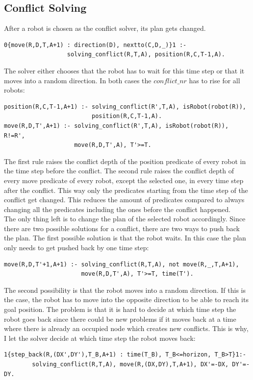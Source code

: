 \documentclass[runningheads]{llncs}
\begin{document}
\subsection{Conflict Solving}
After a robot is chosen as the conflict solver, its plan gets changed. 
\begin{verbatim}
0{move(R,D,T,A+1) : direction(D), nextto(C,D,_)}1 :- 
                  solving_conflict(R,T,A), position(R,C,T-1,A).
\end{verbatim}
The solver either chooses that the robot has to wait for this time step or that it moves into a random direction.
In both cases the $conflict\_nr$ has to rise for all robots:
\begin{verbatim}
position(R,C,T-1,A+1) :- solving_conflict(R',T,A), isRobot(robot(R)),
                         position(R,C,T-1,A).
move(R,D,T',A+1) :- solving_conflict(R',T,A), isRobot(robot(R)), R!=R', 
                    move(R,D,T',A), T'>=T.
\end{verbatim}
The first rule raises the conflict depth of the position predicate of every robot in the time step before the conflict. The second rule raises the conflict depth of every move predicate of every robot, except the selected one, in every time step after the conflict. This way only the predicates starting from the time step of the conflict get changed. This reduces the amount of predicates compared to always changing all the predicates including the ones before the conflict happened. \\
The only thing left is to change the plan of the selected robot accordingly. Since there are two possible solutions for a conflict, there are two ways to push back the plan. The first possible solution is that the robot waits. In this case the plan only needs to get pushed back by one time step:
\begin{verbatim}
move(R,D,T'+1,A+1) :- solving_conflict(R,T,A), not move(R,_,T,A+1), 
                      move(R,D,T',A), T'>=T, time(T').
\end{verbatim}
The second possibility is that the robot moves into a random direction. If this is the case, the robot has to move into the opposite direction to be able to reach its goal position. The problem is that it is hard to decide at which time step the robot goes back since there could be new problems if it moves back at a time where there is already an occupied node which creates new conflicts. This is why, I let the solver decide at which time step the robot moves back:
\begin{verbatim}
1{step_back(R,(DX',DY'),T_B,A+1) : time(T_B), T_B<=horizon, T_B>T}1:- 
        solving_conflict(R,T,A), move(R,(DX,DY),T,A+1), DX'=-DX, DY'=-DY.
\end{verbatim}
\end{document}
